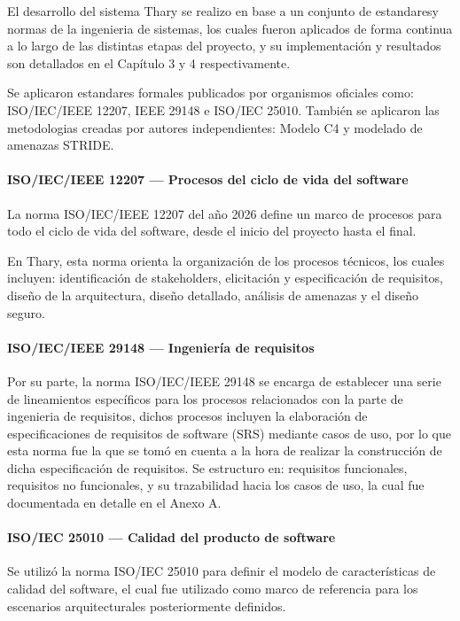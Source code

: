 El desarrollo del sistema Thary se realizo en base a un conjunto de estandaresy normas de la ingenieria de sistemas, los cuales fueron aplicados de forma continua a lo largo de las distintas etapas del proyecto, y su implementación y resultados son detallados en el Capítulo 3 y 4 respectivamente. 

Se aplicaron estandares formales publicados por organismos oficiales como: ISO/IEC/IEEE 12207, IEEE 29148 e ISO/IEC 25010. También se aplicaron las metodologias creadas por autores independientes: Modelo C4 y modelado de amenazas STRIDE.

\paragraph{ISO/IEC/IEEE 12207 — Procesos del ciclo de vida del software}
La norma ISO/IEC/IEEE 12207 del año 2026 \cite{iso12207} define un marco de procesos para todo el ciclo de vida del software, desde el inicio del proyecto hasta el final. 

En Thary, esta norma orienta la organización de los procesos técnicos, los cuales incluyen: identificación de stakeholders, elicitación y especificación de requisitos, diseño de la arquitectura, diseño detallado, análisis de amenazas y el diseño seguro.

\paragraph{ISO/IEC/IEEE 29148 — Ingeniería de requisitos}

Por su parte, la norma ISO/IEC/IEEE 29148 \cite{ieee29148} se encarga de establecer una serie de lineamientos específicos para los procesos relacionados con la parte de ingenieria de requisitos, dichos procesos incluyen la elaboración de especificaciones de requisitos de software (SRS) mediante casos de uso, por lo que esta norma fue la que se tomó en cuenta a la hora de realizar la construcción de dicha especificación de requisitos. Se estructuro en: requisitos funcionales, requisitos no funcionales, y su trazabilidad hacia los casos de uso, la cual fue documentada en detalle en el Anexo A.

\paragraph{ISO/IEC 25010 — Calidad del producto de software}
Se utilizó la norma ISO/IEC 25010 \cite{iso25010} para definir el modelo de características de calidad del software, el cual fue utilizado como marco de referencia para los escenarios arquitecturales posteriormente definidos. 

